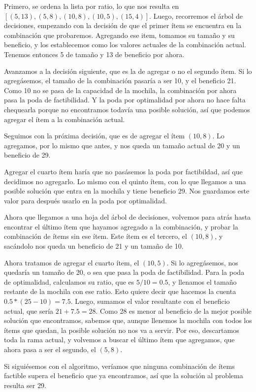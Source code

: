\documentclass[10pt, a4paper]{article}
\begin{document}
Primero, se ordena la lista por ratio, lo que nos resulta en $[(5, 13), (5, 8), (10, 8), (10, 5), (15, 4)]$. Luego, recorremos el árbol de decisiones, empezando con la decisión de que el primer ítem se encuentra en la combinación que probaremos. Agregando ese item, tomamos su tamaño y su beneficio, y los establecemos como los valores actuales de la combinación actual. Tenemos entonces 5 de tamaño y 13 de beneficio por ahora.\par
Avanzamos a la decisión siguiente, que es la de agregar o no el segundo ítem. Si lo agregásemos, el tamaño de la combinación pasaría a ser 10, y el beneficio 21. Como 10 no se pasa de la capacidad de la mochila, la combinación por ahora pasa la poda de factibilidad. Y la poda por optimalidad por ahora no hace falta chequearla porque no encontramos todavía una posible solución, así que podemos agregar el ítem a la combinación actual.\par
Seguimos con la próxima decisión, que es de agregar el ítem $(10, 8)$. Lo agregamos, por lo mismo que antes, y nos queda un tamaño actual de 20 y un beneficio de 29.\par
Agregar el cuarto ítem haría que no pasásemos la poda por factibildad, así que decidimos no agregarlo. Lo mismo con el quinto ítem, con lo que llegamos a una posible solución que entra en la mochila y tiene beneficio 29. Nos guardamos este valor para después usarlo en la poda por optimalidad.\par
Ahora que llegamos a una hoja del árbol de decisiones, volvemos para atrás hasta encontrar el último ítem que hayamos agregado a la combinación, y probar la combinación de ítems sin ese ítem. Este ítem es el tercero, el $(10, 8)$, y sacándolo nos queda un beneficio de 21 y un tamaño de 10.\par
Ahora tratamos de agregar el cuarto ítem, el $(10, 5)$. Si lo agregásemos, nos quedaría un tamaño de 20, o sea que pasa la poda de factibilidad. Para la poda de optimalidad, calculamos su ratio, que es $5 / 10 = 0.5$, y llenamos el tamaño restante de la mochila con ese ratio. Esto quiere decir que hacemos la cuenta $0.5 * (25 - 10) = 7.5$. Luego, sumamos el valor resultante con el beneficio actual, que sería $21 + 7.5 = 28$. Como 28 es menor al beneficio de la mejor posible solución que encontramos, sabemos que, aunque llenemos la mochila con todos los ítems que quedan, la posible solución no nos va a servir. Por eso, descartamos toda la rama actual, y volvemos a buscar el último ítem que agregamos, que ahora pasa a ser el segundo, el $(5, 8)$.\par
Si siguiésemos con el algoritmo, veríamos que ninguna combinación de ítems factible supera el beneficio que ya encontramos, así que la solución al problema resulta ser 29.\par
\end{document}
